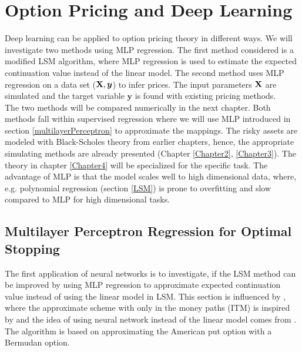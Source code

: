 
\chapter{Option Pricing and Deep Learning} %

\label{Chapter5} %

Deep learning can be applied to option pricing theory in different ways. We will investigate two methods using MLP regression. The first method considered is a modified LSM algorithm, where MLP regression is used to estimate the expected continuation value instead of the linear model. The second method uses MLP regression on a data set ($\mathbf{X}, \bm{y}$) to infer prices. The input parameters $\mathbf{X}$ are simulated and the target variable $\bm{y}$ is found with existing pricing methods.\\

The two methods will be compared numerically in the next chapter. Both methods fall within supervised regression where we will use MLP introduced in section \ref{multilayerPerceptron} to approximate the mappings. The risky assets are modeled with Black-Scholes theory from earlier chapters, hence, the appropriate simulating methods are already presented (Chapter \ref{Chapter2}, \ref{Chapter3}). The theory in chapter \ref{Chapter4} will be specialized for the specific task. The advantage of MLP is that the model scales well to high dimensional data, where, e.g. polynomial regression (section \ref{LSM}) is prone to overfitting and slow compared to MLP for high dimensional tasks. 

\section{Multilayer Perceptron Regression for Optimal Stopping}
The first application of neural networks is to investigate, if the LSM method can be improved by using MLP regression to approximate expected continuation value instead of using the linear model in LSM. This section is influenced by \parencite{LSM, Lelong19, KohlerMichael2010}, where the approximate scheme with only in the money paths (ITM) is inspired by \parencite{LSM} and the idea of using neural network instead of the linear model comes from \parencite{KohlerMichael2010, Lelong19}. The algorithm is based on approximating the American put option with a Bermudan option. \\

